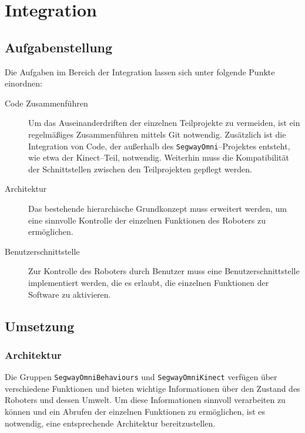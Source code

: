 
\chapter{Integration}
\label{integration_cha}
\authorsection{\editorjulian}

\section{Aufgabenstellung}
\label{aufgabenstellung_integration_sec}

Die Aufgaben im Bereich der Integration lassen sich unter folgende Punkte einordnen:

\begin{description}
\item[Code Zusammenführen]
Um das Auseinanderdriften der einzelnen Teilprojekte zu vermeiden, ist ein regelmäßiges Zusammenführen 
mittels Git notwendig. Zusätzlich ist die Integration von Code, der außerhalb des \lstinline{SegwayOmni}--Projektes 
entsteht, wie etwa der Kinect--Teil, notwendig. Weiterhin muss die Kompatibilität der Schnittstellen 
zwischen den Teilprojekten gepflegt werden.

\item[Architektur]
Das bestehende hierarchische Grundkonzept muss erweitert werden, um eine sinnvolle Kontrolle der 
einzelnen Funktionen des Roboters zu ermöglichen.

\item[Benutzerschnittstelle]
Zur Kontrolle des Roboters durch Benutzer muss eine Benutzerschnittstelle implementiert werden, die es 
erlaubt, die einzelnen Funktionen der Software zu aktivieren.

\end{description}

\section{Umsetzung}
\label{umsetzung_integration_sec}

\subsection{Architektur}
\label{integration_architektur_sec}

Die Gruppen \lstinline{SegwayOmniBehaviours} und \lstinline{SegwayOmniKinect} verfügen über 
verschiedene Funktionen und bieten wichtige Informationen über den Zustand des Roboters und 
dessen Umwelt. Um diese Informationen sinnvoll verarbeiten zu können und ein Abrufen der einzelnen 
Funktionen zu ermöglichen, ist es notwendig, eine entsprechende Architektur bereitzustellen.

